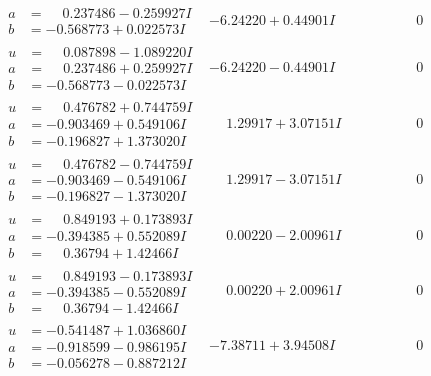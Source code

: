 \documentclass[1p]{elsarticle_modified}
\theoremstyle{definition}
\begin{document}
$$\begin{array}{c|c|c}
\begin{aligned}
a &= \phantom{-}0.237486 - 0.259927 I \\
b &= -0.568773 + 0.022573 I\end{aligned}
 & -6.24220 + 0.44901 I & \phantom{-0.000000 } 0 \\ \hline\begin{aligned}
u &= \phantom{-}0.087898 - 1.089220 I \\
a &= \phantom{-}0.237486 + 0.259927 I \\
b &= -0.568773 - 0.022573 I\end{aligned}
 & -6.24220 - 0.44901 I & \phantom{-0.000000 } 0 \\ \hline\begin{aligned}
u &= \phantom{-}0.476782 + 0.744759 I \\
a &= -0.903469 + 0.549106 I \\
b &= -0.196827 + 1.373020 I\end{aligned}
 & \phantom{-}1.29917 + 3.07151 I & \phantom{-0.000000 } 0 \\ \hline\begin{aligned}
u &= \phantom{-}0.476782 - 0.744759 I \\
a &= -0.903469 - 0.549106 I \\
b &= -0.196827 - 1.373020 I\end{aligned}
 & \phantom{-}1.29917 - 3.07151 I & \phantom{-0.000000 } 0 \\ \hline\begin{aligned}
u &= \phantom{-}0.849193 + 0.173893 I \\
a &= -0.394385 + 0.552089 I \\
b &= \phantom{-}0.36794 + 1.42466 I\end{aligned}
 & \phantom{-}0.00220 - 2.00961 I & \phantom{-0.000000 } 0 \\ \hline\begin{aligned}
u &= \phantom{-}0.849193 - 0.173893 I \\
a &= -0.394385 - 0.552089 I \\
b &= \phantom{-}0.36794 - 1.42466 I\end{aligned}
 & \phantom{-}0.00220 + 2.00961 I & \phantom{-0.000000 } 0 \\ \hline\begin{aligned}
u &= -0.541487 + 1.036860 I \\
a &= -0.918599 - 0.986195 I \\
b &= -0.056278 - 0.887212 I\end{aligned}
 & -7.38711 + 3.94508 I & \phantom{-0.000000 } 0 \\ \hline\begin{aligned}

\end{aligned}
\end{array}$$
\end{document}
